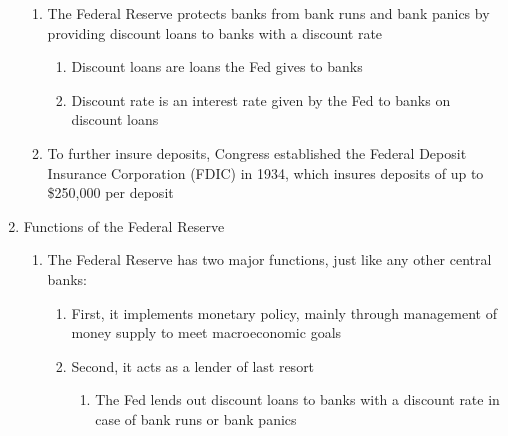 \documentclass[12pt]{article}
\begin{document}
\begin{enumerate}
\begin{enumerate}
          \item The Federal Reserve protects banks from bank runs and bank panics by providing discount loans to banks with a discount rate

            \begin{enumerate}
                
              \item Discount loans are loans the Fed gives to banks

              \item Discount rate is an interest rate given by the Fed to banks on discount loans

            \end{enumerate}

          \item To further insure deposits, Congress established the Federal Deposit Insurance Corporation (FDIC) in 1934, which insures deposits of up to \$250,000 per deposit

        \end{enumerate}

      \item Functions of the Federal Reserve

        \begin{enumerate}

          \item The Federal Reserve has two major functions, just like any other central banks:

            \begin{enumerate}

              \item First, it implements monetary policy, mainly through management of money supply to meet macroeconomic goals

              \item Second, it acts as a lender of last resort

                \begin{enumerate}

                  \item The Fed lends out discount loans to banks with a discount rate in case of bank runs or bank panics

                \end{enumerate}

            \end{enumerate}

        \end{enumerate}


\end{enumerate}
\end{document}
